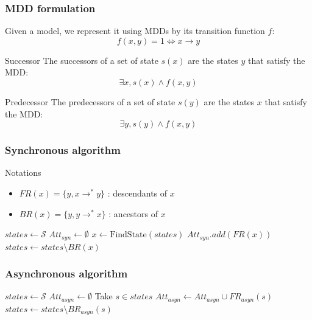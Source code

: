 \documentclass{beamer}
\begin{document}
\begin{frame}
  \frametitle{MDD formulation}
  \begin{block}{}
    Given a model, we represent it using MDDs by its transition function $f$:
    $$ f(x,y) =1 \Leftrightarrow x \rightarrow y$$
  \end{block}
  
  \begin{block}{Successor}
    The successors of a set of state $s(x)$ are the states $y$ that satisfy the MDD:
    $$ \exists x, s(x) \wedge f(x,y)$$
  \end{block}
  
  \begin{block}{Predecessor}
    The predecessors of a set of state $s(y)$ are the states $x$ that satisfy the MDD:
    $$ \exists y, s(y) \wedge f(x,y)$$
  \end{block}
\end{frame}

\begin{frame}
  \frametitle{Synchronous algorithm}
  
  \begin{block}{Notations}
    \begin{itemize}
    \item $FR(x) = \{ y,  x \rightarrow^* y \}$ : descendants of $x$
    \item $BR(x) = \{ y, y \rightarrow^* x \} $ : ancestors of $x$
    \end{itemize}
  \end{block}
  
  \bigskip
  \begin{algorithmic}
    \State $states \gets \mathcal S$
    \State $Att_{syn} \gets \emptyset$
      \State $x \gets \text{FindState}(states)$
      \State $Att_{syn}.add(FR(x))$
      \State $states \gets states \setminus BR(x)$
    \EndWhile
  \end{algorithmic}
  
\end{frame}

\begin{frame}
  \frametitle{Asynchronous algorithm}
  
  
  \begin{algorithmic}
    \State $states \gets \mathcal{S}$
    \State $Att_{asyn} \gets \emptyset$
      \State Take $s \in states$ 
        \State $Att_{asyn} \gets Att_{asyn} \cup FR_{asyn}(s)$
      \EndIf 
      \State $states \gets states \setminus BR_{asyn}(s)$
    \EndWhile
  \end{algorithmic}
\end{frame}
\end{document}
